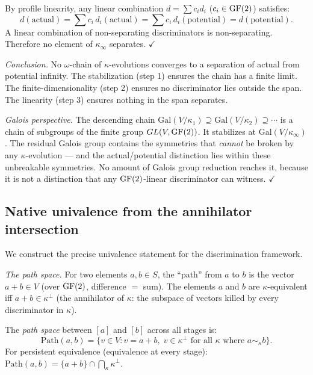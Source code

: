 By profile linearity, any linear combination
$d = \sum c_i d_i$ ($c_i \in \operatorname{GF}(2)$) satisfies:
\[
  d(\text{actual}) = \sum c_i\, d_i(\text{actual})
  = \sum c_i\, d_i(\text{potential})
  = d(\text{potential}).
\]
A linear combination of non-separating discriminators
is non-separating. Therefore no element of
$\kappa_\infty$ separates. $\checkmark$

\emph{Conclusion.}
No $\omega$-chain of $\kappa$-evolutions converges to a
separation of actual from potential infinity. The
stabilization (step 1) ensures the chain has a finite
limit. The finite-dimensionality (step 2) ensures no
discriminator lies outside the span. The linearity
(step 3) ensures nothing in the span separates.

\emph{Galois perspective.}
The descending chain $\mathrm{Gal}(V/\kappa_1) \supseteq
\mathrm{Gal}(V/\kappa_2) \supseteq \cdots$ is a chain
of subgroups of the finite group $GL(V, \operatorname{GF}(2))$.
It stabilizes at $\mathrm{Gal}(V/\kappa_\infty)$.
The residual Galois group contains the symmetries that
\emph{cannot} be broken by any $\kappa$-evolution ---
and the actual/potential distinction lies within these
unbreakable symmetries. No amount of Galois group
reduction reaches it, because it is not a distinction
that any $\operatorname{GF}(2)$-linear discriminator can witness.
$\checkmark$


\subsection{Native univalence from the annihilator
  intersection}
\label{app:native-univalence}

We construct the precise univalence statement for the
discrimination framework.

\emph{The path space.}
For two elements $a, b \in S$, the ``path'' from $a$ to
$b$ is the vector $a + b \in V$ (over $\operatorname{GF}(2)$,
difference $=$ sum). The elements $a$ and $b$ are
$\kappa$-equivalent iff $a + b \in \kappa^\perp$ (the
annihilator of $\kappa$: the subspace of vectors killed
by every discriminator in $\kappa$).

The \emph{path space} between $[a]$ and $[b]$ across all
stages is:
\[
  \mathrm{Path}(a, b) = \{v \in V : v = a + b,\;
  v \in \kappa^\perp \text{ for all } \kappa
  \text{ where } a \sim_\kappa b\}.
\]
For persistent equivalence (equivalence at every stage):
$\mathrm{Path}(a, b) = \{a + b\} \cap
\bigcap_\kappa \kappa^\perp$.

